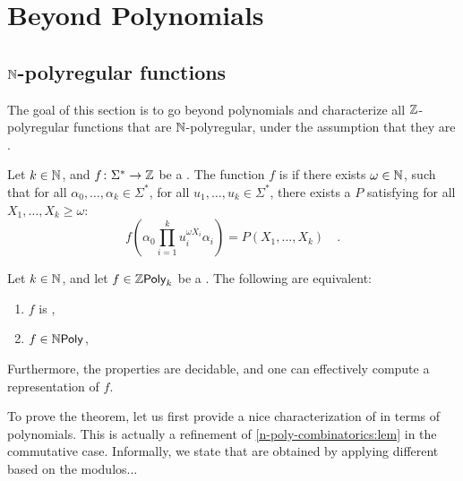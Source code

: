 \section{Beyond Polynomials}
\label{sec:deciding}

\subsection{$\mathbb{N}$-polyregular functions}

The goal of this section is to go beyond polynomials and characterize all
$\mathbb{Z}$-polyregular functions that are $\mathbb{N}$-polyregular, under the assumption
that they are .

\begin{definition}
    \label{k-combinatorial:def}
    Let $k \in \mathbb{N}$, and $f \colon \Sigma^* \to \mathbb{Z}$
    be a . The function $f$ is 
     if there exists $\omega \in \mathbb{N}$,
    such that
    for all
    $\alpha_0, \dots, \alpha_k \in \Sigma^*$,
    for all $u_1, \dots, u_k \in \Sigma^*$,
    there exists a  $P$
    satisfying for all $X_1, \dots, X_k \geq \omega$:
    \begin{equation*}
        f
        \left(
            \alpha_0 \prod_{i = 1}^k u_i^{\omega X_i} \alpha_i
        \right)
        = 
        P(X_1, \dots, X_k) \quad .
    \end{equation*}
\end{definition}

\begin{theorem}
    \label{decidable-n-poly:thm}
    Let $k \in \mathbb{N}$, and 
    let $f \in \ZPoly[k]$ be a  .
    The following are equivalent:
    \begin{enumerate}
        \item $f$ is ,
        \item $f \in \NPoly$,
    \end{enumerate}
    Furthermore, the properties are decidable,
    and one can effectively compute a representation of $f$.
\end{theorem}

To prove the theorem, let us first provide a nice characterization of
  in terms of polynomials.
This is actually a refinement of \cref{n-poly-combinatorics:lem} in the
commutative case. Informally, we state that 
 are obtained by applying different
 based on the modulos...

